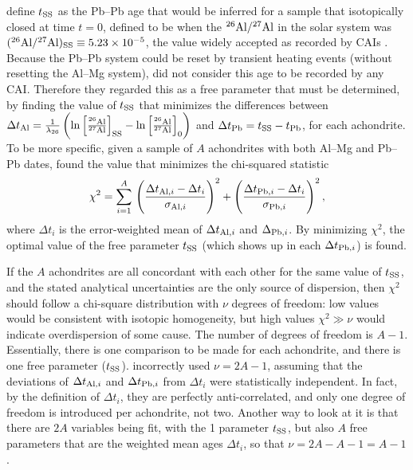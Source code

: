 \citet{desch2023a} define $\mbox{$t_{\rm SS}$}$ as the Pb--Pb age that would be
inferred for a sample that isotopically closed at time $t=0$, defined
to be when the $\mbox{${}^{26}{\rm Al}/{}^{27}{\rm Al}$}$ in the solar system was $(\mbox{${}^{26}{\rm Al}/{}^{27}{\rm Al}$})_{\rm SS}
\equiv 5.23 \times 10^{-5}$, the value widely accepted as recorded by
CAIs \citep{jacobsen2008}.  Because the Pb--Pb system could be reset
by transient heating events (without resetting the Al--Mg system),
\citet{desch2023a} did not consider this age to be recorded by any
CAI.  Therefore they regarded this as a free parameter that must be
determined, by finding the value of $\mbox{$t_{\rm SS}$}$ that minimizes the
differences between $\Delta t_{\rm Al} = \frac{1}{\lambda_{26}} \left(
\ln \left[ \frac{{}^{26}{\rm Al}}{{}^{27}{\rm Al}} \right]_{\rm SS}
-\ln \left[ \frac{{}^{26}{\rm Al}}{{}^{27}{\rm Al}} \right]_{0}
\right)$ and $\Delta t_{\rm Pb} = t_{\rm SS} - t_{\rm Pb}$, for each
achondrite.  To be more specific, given a sample of $A$ achondrites
with both Al--Mg and Pb--Pb dates, \citet{desch2023a} found the value
that minimizes the chi-squared statistic
\begin{equation}
\chi^2 = \sum_{i=1}^{A} \, 
\left( \frac{ \Delta t_{{\rm Al},i} - \Delta t_i }{ \sigma_{{\rm Al},i} } \right)^2 
+\left( \frac{ \Delta t_{{\rm Pb},i} - \Delta t_i}{ \sigma_{{\rm Pb},i} } \right)^2,
\label{eq:chi2}
\end{equation}
where $\Delta t_i$ is the error-weighted mean of $\Delta t_{{\rm
    Al},i}$ and $\Delta_{{\rm Pb},i}$.  By minimizing $\chi^2$, the
optimal value of the free parameter $\mbox{$t_{\rm SS}$}$ (which shows up in each
$\Delta t_{{\rm Pb},i}$) is found.\medskip

If the $A$ achondrites are all concordant with each other for the same
value of $\mbox{$t_{\rm SS}$}$, and the stated analytical uncertainties are the only
source of dispersion, then $\chi^2$ should follow a chi-square
distribution with $\nu$ degrees of freedom: low values would be
consistent with isotopic homogeneity, but high values $\chi^2 \gg \nu$
would indicate overdispersion of some cause.  The number of degrees of
freedom is $A - 1$.  Essentially, there is one comparison to be made
for each achondrite, and there is one free parameter ($\mbox{$t_{\rm SS}$}$).
\citet{desch2023a} incorrectly used $\nu = 2 A - 1$, assuming that the
deviations of $\Delta t_{{\rm Al},i}$ and $\Delta t_{{\rm Pb},i}$ from
$\Delta t_i$ were statistically independent.  In fact, by the
definition of $\Delta t_i$, they are perfectly anti-correlated, and
only one degree of freedom is introduced per achondrite, not two.
Another way to look at it is that there are $2 A$ variables being fit,
with the 1 parameter $\mbox{$t_{\rm SS}$}$, but also $A$ free parameters that are the
weighted mean ages $\Delta t_i$, so that $\nu = 2 A - A - 1 = A -
1$.\medskip


